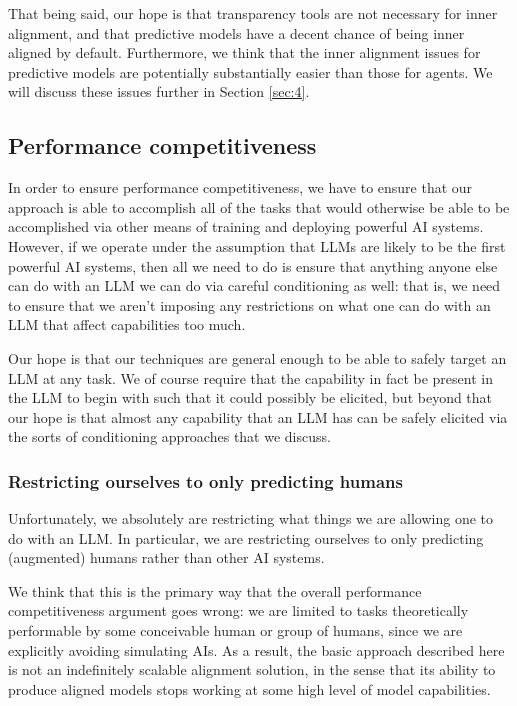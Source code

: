 \documentclass[
  onecolumn,
  natbib,
]{miri-tech-article}
\begin{document}
That being said, our hope is that transparency tools are not necessary for inner alignment, and that predictive models have a decent chance of being inner aligned by default. Furthermore, we think that the inner alignment issues for predictive models are potentially substantially easier than those for agents. We will discuss these issues further in Section \ref{sec:4}.


\subsection{Performance competitiveness}

In order to ensure performance competitiveness, we have to ensure that our approach is able to accomplish all of the tasks that would otherwise be able to be accomplished via other means of training and deploying powerful AI systems. However, if we operate under the assumption that LLMs are likely to be the first powerful AI systems, then all we need to do is ensure that anything anyone else can do with an LLM we can do via careful conditioning as well: that is, we need to ensure that we aren't imposing any restrictions on what one can do with an LLM that affect capabilities too much.

Our hope is that our techniques are general enough to be able to safely target an LLM at any task. We of course require that the capability in fact be present in the LLM to begin with such that it could possibly be elicited, but beyond that our hope is that almost any capability that an LLM has can be safely elicited via the sorts of conditioning approaches that we discuss.


\subsubsection{Restricting ourselves to only predicting humans}

Unfortunately, we absolutely are restricting what things we are allowing one to do with an LLM. In particular, we are restricting ourselves to only predicting (augmented) humans rather than other AI systems.

We think that this is the primary way that the overall performance competitiveness argument goes wrong: we are limited to tasks theoretically performable by some conceivable human or group of humans, since we are explicitly avoiding simulating AIs. As a result, the basic approach described here is not an indefinitely scalable alignment solution, in the sense that its ability to produce aligned models stops working at some high level of model capabilities.
\end{document}
